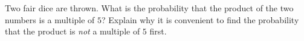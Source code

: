 Two fair dice are thrown. What is the probability that the product of the two numbers is a multiple of $5$? Explain why it is convenient to find the probability that the product is \emph{not} a multiple of $5$ first.
